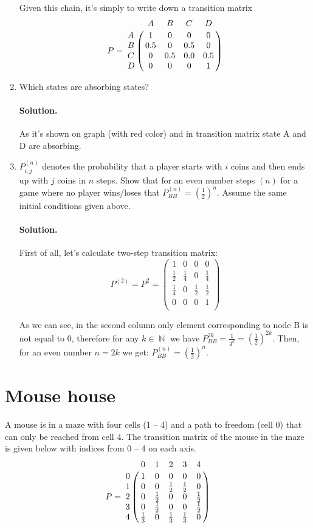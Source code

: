 \documentclass[a4paper, 12pt]{article}
\DeclareMathOperator{\N}{\mathbb{N}}
\newcommand{\rbra}[1]{\left( #1 \right)}
\newcommand{\sol}[1]{\paragraph{Solution.} #1}
\newcommand{\task}[2]{
    \item #1 \sol{#2}
}
\begin{document}
\begin{enumerate}
{        Given this chain, it's simply to write down a transition matrix
        \[
            P = \bordermatrix{
                & A & B & C & D         \cr
                A & 1 & 0 & 0 & 0       \cr
                B & 0.5 & 0 & 0.5 & 0   \cr
                C & 0 & 0.5 & 0.0 & 0.5 \cr
                D & 0 & 0 & 0 & 1
            }
        \]
    }
    \task{Which states are absorbing states?}
    {
        As it's shown on graph (with red color)
        and in transition matrix
        state A and D are absorbing.
    }
    \task{$P^{(n)}_{i,j}$ denotes the probability that a player starts with $i$ coins and then ends up with $j$
        coins in $n$ steps. Show that for an even number steps $(n)$ for a game where no player
        wins/loses that $P^{(n)}_{BB} = \rbra{\frac{1}{2}}^n $. Assume the same initial conditions given above.}
    {
        First of all, let's calculate two-step transition matrix:
        \[
            P^{(2)} = P^2 = \begin{pmatrix}
                1           & 0           & 0           & 0           \\
                \frac{1}{2} & \frac{1}{4} & 0           & \frac{1}{4} \\
                \frac{1}{4} & 0           & \frac{1}{2} & \frac{1}{2} \\
                0           & 0           & 0           & 1           \\
            \end{pmatrix}
        \]

        As we can see, in the second column only element corresponding to node B
        is not equal to 0, therefore for any $k \in \N$ we have $P^{2k}_{BB} = \frac{1}{4^k} = \rbra{\frac{1}{2}}^{2k} $.
        Then, for an even number $n = 2k$ we get: $P^{(n)}_{BB} = \rbra{\frac{1}{2}}^n$.
    }
\end{enumerate}

\section{Mouse house}
A mouse is in a maze with four cells (1 -- 4) and a path to freedom (cell 0) that can only
be reached from cell 4. The transition matrix of the mouse in the maze is given below with
indices from 0 -- 4 on each axis.
\[
    P = \bordermatrix{
        & 0 & 1 & 2 & 3 & 4 \cr
        0 & 1 & 0 & 0 & 0 & 0 \cr
        1 & 0 & 0 & \frac{1}{2} & \frac{1}{2} & 0 \cr
        2 & 0 & \frac{1}{2} & 0 & 0 & \frac{1}{2} \cr
        3 & 0 & \frac{1}{2} & 0 & 0 & \frac{1}{2} \cr
        4 & \frac{1}{3} & 0 & \frac{1}{3} & \frac{1}{3} & 0
    }
\]
\end{document}
